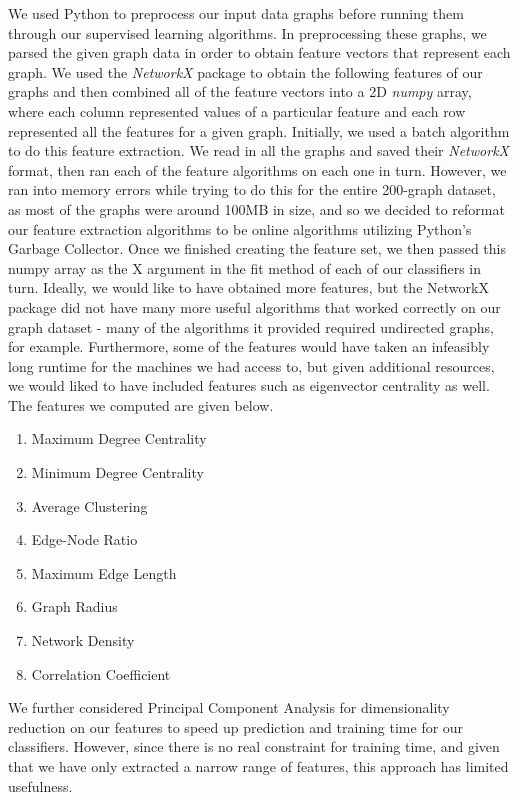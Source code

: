 \documentclass{article}
\begin{document}
We used Python to preprocess our input data graphs before running them through our supervised learning algorithms. In preprocessing these graphs, we parsed the given graph data in order to obtain feature vectors that represent each graph. We used the \textit{NetworkX} package to obtain the following features of our graphs and then combined all of the feature vectors into a 2D \textit{numpy} array, where each column represented values of a particular feature and each row represented all the features for a given graph. Initially, we used a batch algorithm to do this feature extraction. We read in all the graphs and saved their \textit{NetworkX} format, then ran each of the feature algorithms on each one in turn. However, we ran into memory errors while trying to do this for the entire 200-graph dataset, as most of the graphs were around 100MB in size, and so we decided to reformat our feature extraction algorithms to be online algorithms utilizing Python's Garbage Collector. Once we finished creating the feature set, we then passed this numpy array as the X argument in the fit method of each of our classifiers in turn. Ideally, we would like to have obtained more features, but the NetworkX package did not have many more useful algorithms that worked correctly on our graph dataset - many of the algorithms it provided required undirected graphs, for example. Furthermore, some of the features would have taken an infeasibly long runtime for the machines we had access to, but given additional resources, we would liked to have included features such as eigenvector centrality as well. The features we computed are given below.

\begin{enumerate}
\item Maximum Degree Centrality
\item Minimum Degree Centrality
\item Average Clustering
\item Edge-Node Ratio
\item Maximum Edge Length
\item Graph Radius
\item Network Density
\item Correlation Coefficient

\end{enumerate}

We further considered Principal Component Analysis for dimensionality reduction on our features to speed up prediction and training time for our classifiers. However, since there is no real constraint for training time, and given that we have only extracted a narrow range of features, this approach has limited usefulness.
\end{document}

